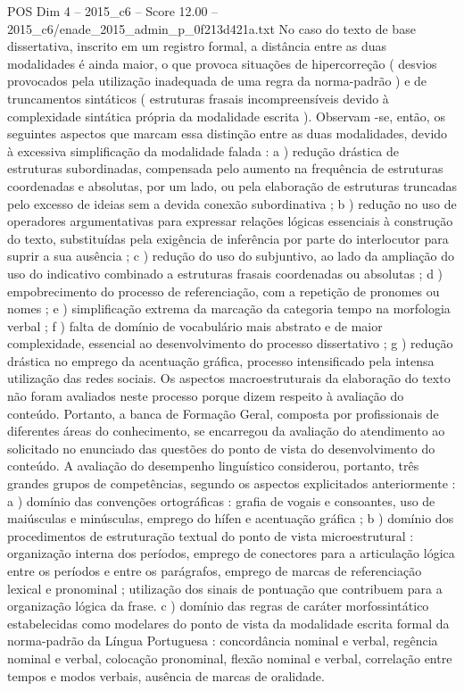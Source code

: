 \begin{textsample}{POS Dim 4 – 2015\_c6 – Score 12.00 – 2015\_c6/enade\_2015\_admin\_p\_0f213d421a.txt}
No caso do texto de base dissertativa, inscrito em um registro formal, a distância entre as duas modalidades é ainda maior, o que provoca situações de hipercorreção ( desvios provocados pela utilização inadequada de uma regra da norma-padrão ) e de truncamentos sintáticos ( estruturas frasais incompreensíveis devido à complexidade sintática própria da modalidade escrita ).
Observam -se, então, os seguintes aspectos que marcam essa distinção entre as duas modalidades, devido à excessiva simplificação da modalidade falada : a ) redução drástica de estruturas subordinadas, compensada pelo aumento na frequência de estruturas coordenadas e absolutas, por um lado, ou pela elaboração de estruturas truncadas pelo excesso de ideias sem a devida conexão subordinativa ; b ) redução no uso de operadores argumentativas para expressar relações lógicas essenciais à construção do texto, substituídas pela exigência de inferência por parte do interlocutor para suprir a sua ausência ; c ) redução do uso do subjuntivo, ao lado da ampliação do uso do indicativo combinado a estruturas frasais coordenadas ou absolutas ; d ) empobrecimento do processo de referenciação, com a repetição de pronomes ou nomes ; e ) simplificação extrema da marcação da categoria tempo na morfologia verbal ; f ) falta de domínio de vocabulário mais abstrato e de maior complexidade, essencial ao desenvolvimento do processo dissertativo ; g ) redução drástica no emprego da acentuação gráfica, processo intensificado pela intensa utilização das redes sociais.
Os aspectos macroestruturais da elaboração do texto não foram avaliados neste processo porque dizem respeito à avaliação do conteúdo.
Portanto, a banca de Formação Geral, composta por profissionais de diferentes áreas do conhecimento, se encarregou da avaliação do atendimento ao solicitado no enunciado das questões do ponto de vista do desenvolvimento do conteúdo.
A avaliação do desempenho linguístico considerou, portanto, três grandes grupos de competências, segundo os aspectos explicitados anteriormente : a ) domínio das convenções ortográficas : grafia de vogais e consoantes, uso de maiúsculas e minúsculas, emprego do hífen e acentuação gráfica ; b ) domínio dos procedimentos de estruturação textual do ponto de vista microestrutural : organização interna dos períodos, emprego de conectores para a articulação lógica entre os períodos e entre os parágrafos, emprego de marcas de referenciação lexical e pronominal ; utilização dos sinais de pontuação que contribuem para a organização lógica da frase. c ) domínio das regras de caráter morfossintático estabelecidas como modelares do ponto de vista da modalidade escrita formal da norma-padrão da Língua Portuguesa : concordância nominal e verbal, regência nominal e verbal, colocação pronominal, flexão nominal e verbal, correlação entre tempos e modos verbais, ausência de marcas de oralidade.

\end{textsample}
